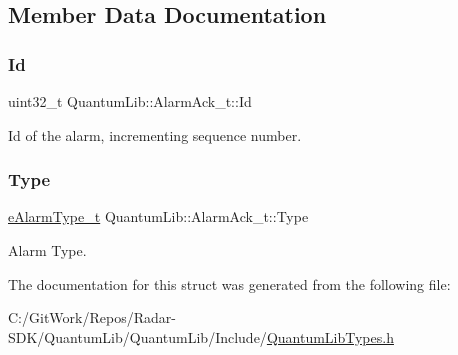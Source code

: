 \subsection{Member Data Documentation}
\mbox{\label{struct_quantum_lib_1_1_alarm_ack__t_a63727f64772eb3db71b3bd81ce0ea6a1}} 
\subsubsection{\texorpdfstring{Id}{Id}}
{\footnotesize\ttfamily uint32\+\_\+t Quantum\+Lib\+::\+Alarm\+Ack\+\_\+t\+::\+Id}



Id of the alarm, incrementing sequence number. 

\mbox{\label{struct_quantum_lib_1_1_alarm_ack__t_a3e330071310ae5fc50e351b9246bbbc6}} 
\subsubsection{\texorpdfstring{Type}{Type}}
{\footnotesize\ttfamily \mbox{\hyperlink{namespace_quantum_lib_a63dd10ad28888fcad99c7b8c5f155750}{e\+Alarm\+Type\+\_\+t}} Quantum\+Lib\+::\+Alarm\+Ack\+\_\+t\+::\+Type}



Alarm Type. 



The documentation for this struct was generated from the following file\+:\begin{DoxyCompactItemize}
\item 
C\+:/\+Git\+Work/\+Repos/\+Radar-\/\+S\+D\+K/\+Quantum\+Lib/\+Quantum\+Lib/\+Include/\mbox{\hyperlink{_quantum_lib_types_8h}{Quantum\+Lib\+Types.\+h}}\end{DoxyCompactItemize}
